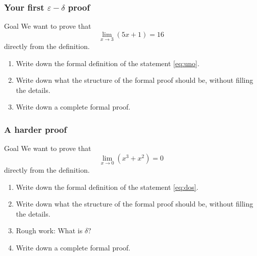 \begin{frame}[t]
	\frametitle{Your first $\varepsilon-\delta$ proof}

	\begin{block}{Goal}
		We want to prove that
		\begin{equation}
			\label{eq:uno}\lim_{x \to 3}\left( 5x + 1 \right) = 16
		\end{equation}
		directly from the definition.
	\end{block}
	\vfill
	\begin{enumerate}

		\item Write down the formal definition of the statement \eqref{eq:uno}.

		\item Write down what the structure of the formal proof should be, without
			filling the details.

		\item Write down a complete formal proof.
	\end{enumerate}
	\vfill
\end{frame}

\begin{frame}
	\frametitle{A harder proof}

	\begin{block}{Goal}
		We want to prove that
		\begin{equation}
			\label{eq:dos}\lim_{x \to 0}\left( x^{3}+ x^{2}\right) = 0
		\end{equation}
		directly from the definition.
	\end{block}
	\vfill
	\begin{enumerate}

		\item Write down the formal definition of the statement \eqref{eq:dos}.

		\item Write down what the structure of the formal proof should be, without
			filling the details.

		\item Rough work: What is $\delta?$

		\item Write down a complete formal proof.
	\end{enumerate}
	\vfill
\end{frame}

